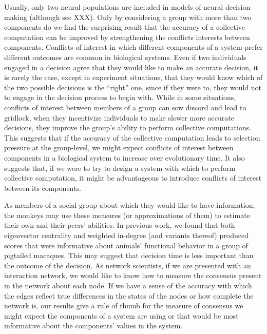 \documentclass{pnastwo}
\begin{document}
\begin{article}
Usually, only two neural populations are included in models of neural decision making (although see XXX).  Only by considering a group with more than two components do we find the surprising result that the accuracy of a collective computation can be improved by strengthening the conflicts interests between components.  Conflicts of interest in which different components of a system prefer different outcomes are common in biological systems. Even if two individuals engaged in a decision agree that they would like to make an accurate decision,  it is rarely the case, except in experiment situations, that they would know which of the two possible decisions is the ``right'' one, since if they were to, they would not to engage in the decision process to begin with. While in some situations, conflicts of interest between members of a group can sow discord and lead to gridlock, when they incentivize individuals to make slower more accurate decisions, they improve the group's ability to perform collective computations. This suggests that if the accuracy of the collective computation leads to selection pressure at the group-level, we might expect conflicts of interest between components in a biological system to increase over evolutionary time. It also suggests that, if we were to try to design a system with which to perform collective computation, it might be advantageous to introduce conflicts of interest between its components. 

As members of a social group about which they would like to have information, the monkeys may use these measures (or approximations of them) to estimate their own and their peers' abilities. In previous work, we found that both eigenvector centrality and weighted in-degree (and variants thereof) produced scores that were informative about animals' functional behavior in a group of pigtailed macaques.  This may suggest that decision time is less important than the outcome of the decision. As network scientists, if we are presented with an interaction network, we would like to know how to measure the consensus present in the network about each node.  If we have a sense of the accuracy with which the edges reflect true differences in the states of the nodes or how complete the network is, our results give a rule of thumb for the measure of consensus we might expect the components of a system are using or that would be most informative about the components' values in the system.


\end{article}
\end{document}
